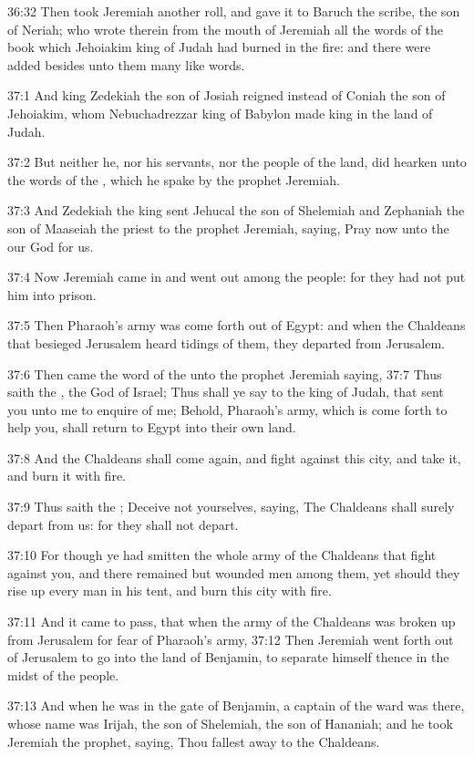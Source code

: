 36:32 Then took Jeremiah another roll, and gave it to Baruch the scribe, the son of Neriah; who wrote therein from the mouth of Jeremiah all the words of the book which Jehoiakim king of Judah had burned in the fire: and there were added besides unto them many like words.

37:1 And king Zedekiah the son of Josiah reigned instead of Coniah the son of Jehoiakim, whom Nebuchadrezzar king of Babylon made king in the land of Judah.

37:2 But neither he, nor his servants, nor the people of the land, did hearken unto the words of the \LORD, which he spake by the prophet Jeremiah.

37:3 And Zedekiah the king sent Jehucal the son of Shelemiah and Zephaniah the son of Maaseiah the priest to the prophet Jeremiah, saying, Pray now unto the \LORD our God for us.

37:4 Now Jeremiah came in and went out among the people: for they had not put him into prison.

37:5 Then Pharaoh's army was come forth out of Egypt: and when the Chaldeans that besieged Jerusalem heard tidings of them, they departed from Jerusalem.

37:6 Then came the word of the \LORD unto the prophet Jeremiah saying, 37:7 Thus saith the \LORD, the God of Israel; Thus shall ye say to the king of Judah, that sent you unto me to enquire of me; Behold, Pharaoh's army, which is come forth to help you, shall return to Egypt into their own land.

37:8 And the Chaldeans shall come again, and fight against this city, and take it, and burn it with fire.

37:9 Thus saith the \LORD; Deceive not yourselves, saying, The Chaldeans shall surely depart from us: for they shall not depart.

37:10 For though ye had smitten the whole army of the Chaldeans that fight against you, and there remained but wounded men among them, yet should they rise up every man in his tent, and burn this city with fire.

37:11 And it came to pass, that when the army of the Chaldeans was broken up from Jerusalem for fear of Pharaoh's army, 37:12 Then Jeremiah went forth out of Jerusalem to go into the land of Benjamin, to separate himself thence in the midst of the people.

37:13 And when he was in the gate of Benjamin, a captain of the ward was there, whose name was Irijah, the son of Shelemiah, the son of Hananiah; and he took Jeremiah the prophet, saying, Thou fallest away to the Chaldeans.

